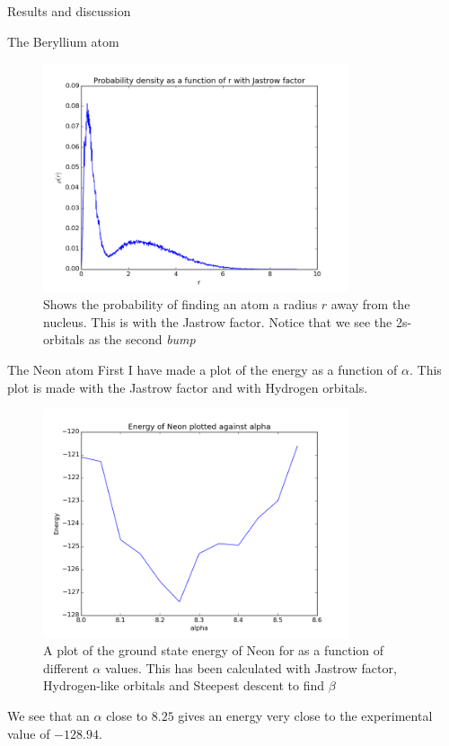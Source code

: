 \documentclass[a4paper, 12pt, titlepage]{article}
\begin{document}
\begin{section}{Results and discussion}
\begin{subsection}{The Beryllium atom}
 \begin{figure}[H]
 	\centering
 	\includegraphics[width=0.8\textwidth]{../../Project3_Gaussian/python_scripts/ProbabilityDensityBeryllium_Jastrow.png}
 	\caption{Shows the probability of finding an atom a radius $r$ away from the nucleus. This is with the Jastrow factor. Notice that we see the 2s-orbitals as the second \textit{bump}}
 \end{figure}

 \end{subsection}

 \begin{subsection}{The Neon atom}
  First I have made a plot of the energy as a function of $\alpha$. This plot is made with the Jastrow factor and with Hydrogen orbitals. 
  \begin{figure}[H]
 	\centering
 	\includegraphics[width=0.8\textwidth]{../python_programs/FindOptimalAlphaNeon.png}
 	\caption{A plot of the ground state energy of Neon for as a function of different $\alpha$ values. This has been calculated with Jastrow factor, Hydrogen-like orbitals and Steepest descent to find $\beta$}
 \end{figure}
 We see that an $\alpha$ close to $8.25$ gives an energy very close to the experimental value of $-128.94$.


\end{subsection}
\end{section}
\end{document}
